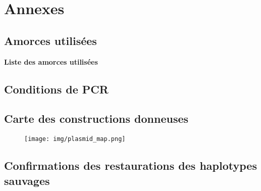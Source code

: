 \newpage
{}
\setcounter{page}{1}

\begin{multicols}{2}
\rmfamily
\tiny

\end{multicols}
\newpage


\setcounter{section}{0}
\section{Annexes}


\setcounter{subsection}{1}
\subsection{Amorces utilisées}
\label{subsec:annexe-amorces}


\caption[Liste des amorces utilisées]{\label{fig:amorces}\textbf{Liste des
    amorces utilisées}}

\subsection{Conditions de PCR}
\label{subsec:annexe-pcr}

\subsection{Carte des constructions donneuses}
\label{subsec:cartes-plasmides}

\begin{figure}[h!]
  \centering
  \texttt{[image: img/plasmid\_map.png]}

\end{figure}



\newpage
\subsection{Confirmations des restaurations des haplotypes sauvages}
\label{subsec:confirm-haplotype}

